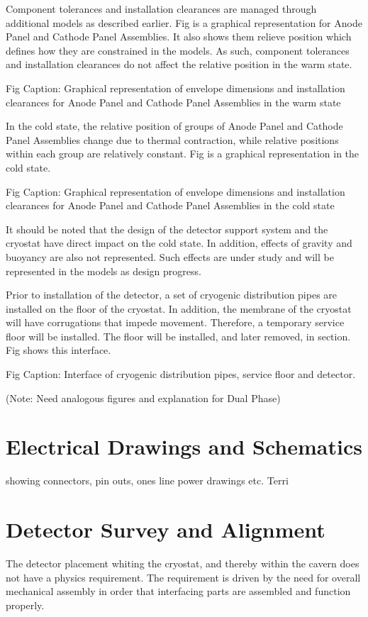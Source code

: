 Component tolerances and installation clearances are managed through
additional models as described earlier. Fig is a graphical
representation for Anode Panel and Cathode Panel Assemblies. It also
shows them relieve position which defines how they are constrained in
the models. As such, component tolerances and installation clearances
do not affect the relative position in the warm state.

Fig
Caption: Graphical representation of envelope dimensions and
installation clearances for Anode Panel and Cathode Panel Assemblies
in the warm state

In the cold state, the relative position of groups of Anode Panel and
Cathode Panel Assemblies change due to thermal contraction, while
relative positions within each group are relatively constant. Fig is a
graphical representation in the cold state.


Fig
Caption: Graphical representation of envelope dimensions and
installation clearances for Anode Panel and Cathode Panel Assemblies
in the cold state

It should be noted that the design of the detector support system and
the cryostat have direct impact on the cold state. In addition,
effects of gravity and buoyancy are also not represented. Such effects
are under study and will be represented in the models as design
progress.

Prior to installation of the detector, a set of cryogenic distribution
pipes are installed on the floor of the cryostat. In addition, the
membrane of the cryostat will have corrugations that impede
movement. Therefore, a temporary service floor will be installed. The
floor will be installed, and later removed, in section. Fig shows this
interface.

Fig
Caption: Interface of cryogenic distribution pipes, service floor and detector.


(Note: Need analogous figures and explanation for Dual Phase)


\section{Electrical Drawings and Schematics}
\label{sec:fdsp-coord-integ-electrical}
showing connectors, pin outs, ones line power drawings etc. Terri


\section{Detector Survey and Alignment}
\label{sec:fdsp-coord-integ-survey}
The detector placement whiting the cryostat, and thereby within the
cavern does not have a physics requirement. The requirement is driven
by the need for overall mechanical assembly in order that interfacing
parts are assembled and function properly.

